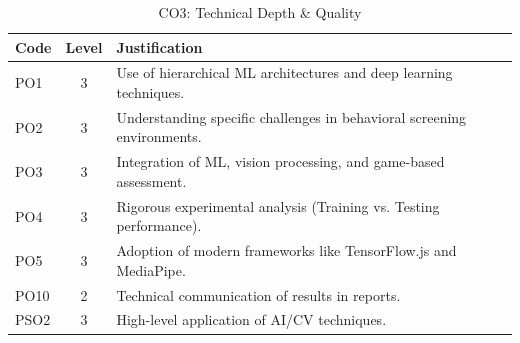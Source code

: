 \documentclass[12pt,a4paper]{report}
\begin{document}
\begin{table}[h!]
    \centering
    \caption{CO3: Technical Depth \& Quality}
    \renewcommand{\arraystretch}{1.3}
    \begin{tabularx}{\textwidth}{@{}l c X@{}}
        \toprule
        \textbf{Code} & \textbf{Level} & \textbf{Justification} \\
        \midrule
        PO1 & 3 & Use of hierarchical ML architectures and deep learning techniques. \\
        PO2 & 3 & Understanding specific challenges in behavioral screening environments. \\
        PO3 & 3 & Integration of ML, vision processing, and game-based assessment. \\
        PO4 & 3 & Rigorous experimental analysis (Training vs. Testing performance). \\
        PO5 & 3 & Adoption of modern frameworks like TensorFlow.js and MediaPipe. \\
        PO10 & 2 & Technical communication of results in reports. \\
        PSO2 & 3 & High-level application of AI/CV techniques. \\
        \bottomrule
    \end{tabularx}
\end{table}
\end{document}
